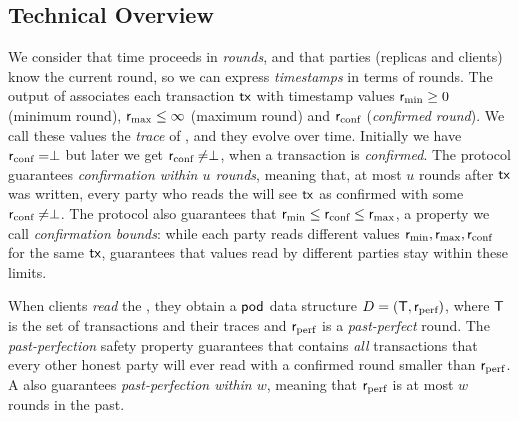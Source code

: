 \subsection{Technical Overview}
We consider that time proceeds in \emph{rounds}, and that parties (replicas and clients) know the current round, so we can express \emph{timestamps} in terms of rounds. The output of \podtm associates each transaction $\textsf{tx}$ with timestamp values $\textsf{r}_\text{min} \geq 0$ (minimum round), $\textsf{r}_\text{max} \leq \infty$ (maximum round) and $\textsf{r}_\text{conf}$ (\emph{confirmed round}). We call these values the \emph{trace} of \tx, and they evolve over time.
Initially we have $\textsf{r}_\text{conf}=\perp$ but later we get $\textsf{r}_\text{conf} \neq \perp$, when a transaction is \emph{confirmed}. The protocol guarantees \emph{confirmation within $u$ rounds}, meaning that, at most $u$ rounds after $\textsf{tx}$ was written, every party who reads the \podtm will see $\textsf{tx}$ as confirmed with some $\textsf{r}_\text{conf} \neq \perp$.
The protocol also guarantees that $\textsf{r}_\text{min} \leq \textsf{r}_\text{conf} \leq \textsf{r}_\text{max}$, a property we call \emph{confirmation bounds}:
while each party reads different values $\textsf{r}_\text{min},\textsf{r}_\text{max},\textsf{r}_\text{conf}$ for the same $\textsf{tx}$, \podtm guarantees that values read by different parties stay within these limits.

When clients \emph{read} the \podtm, they obtain a $\textsf{pod}$ data structure $D = (\textsf{T}, \textsf{r}_\text{perf})$, where $\textsf{T}$ is the set of transactions and their traces and $\textsf{r}_\text{perf}$ is a \emph{past-perfect} round. The \emph{past-perfection} safety property guarantees that
\txSet contains \emph{all} transactions that every other honest party will ever read with a confirmed round smaller than $\textsf{r}_\text{perf}$.  A \podtm also guarantees \emph{past-perfection within $w$}, meaning that $\textsf{r}_\text{perf}$ is at most $w$ rounds in the past.


